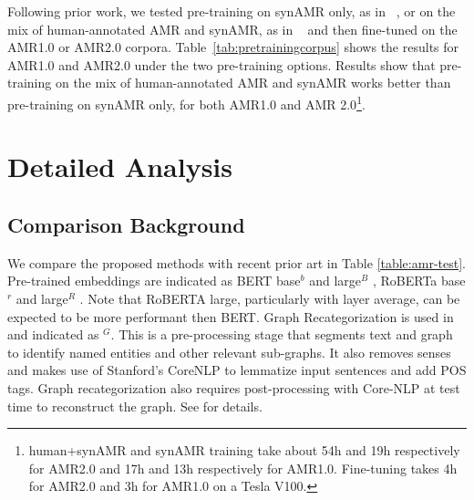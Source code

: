 \documentclass[11pt,a4paper]{article}
\begin{document}
Following prior work, we tested pre-training on synAMR only, as in ~\cite{konstas2017neural}, or on the mix of human-annotated AMR and synAMR, as in ~\cite{noordbos2017amr} and then fine-tuned on the AMR1.0 or AMR2.0 corpora. Table~\ref{tab:pretrainingcorpus} shows the results for AMR1.0 and AMR2.0 under the two pre-training options. Results show that pre-training on the mix of human-annotated AMR and synAMR works better than pre-training on synAMR only, for both AMR1.0 and AMR 2.0\footnote{human+synAMR and synAMR training take about 54h and 19h respectively for AMR2.0 and 17h and 13h respectively for AMR1.0. Fine-tuning takes 4h for AMR2.0 and 3h for AMR1.0 on a Tesla V100.}. 

\begin{table}[h]
  \centering
{}
  \caption{Dev-set Smatch for AMR1.0 and AMR2.0. for the baseline parser and synthetic AMR training. Average results for $3$ seeds with standard deviation.}
  \label{tab:pretrainingcorpus}
\end{table}

 

\section{Detailed Analysis}
\label{section:final}
\subsection{Comparison Background}

We compare the proposed methods with recent prior art in Table \ref{table:amr-test}. Pre-trained embeddings are indicated as BERT base$^b$ and large$^B$ \cite{devlin-etal-2019-bert}, RoBERTa base$^r$ and large$^R$ \cite{liu2019roberta}. Note that RoBERTA large, particularly with layer average, can be expected to be more performant then BERT. Graph Recategorization is used in \cite{lyu2018amr,zhang2019broad} and indicated as $^G$. This is a pre-processing stage that segments text and graph to identify named entities and other relevant sub-graphs. It also removes senses and makes use of Stanford's CoreNLP to lemmatize input sentences and add POS tags. Graph recategorization also requires post-processing with Core-NLP at test time to reconstruct the graph. See \cite[Sec.~6]{zhang2019broad} for details. 
\end{document}
